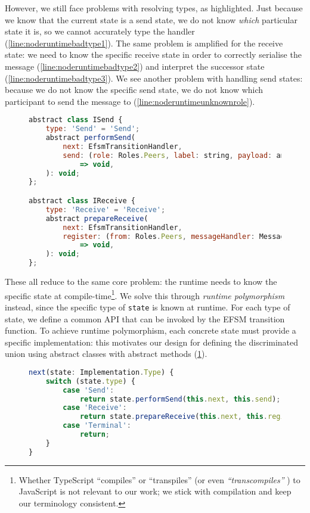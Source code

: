 However, we still face problems with resolving types, as highlighted.
Just because we know that the current state is a send state,
we do not know \textit{which} particular state it is,
so we cannot accurately type the handler (\cref{line:noderuntimebadtype1}).
The same problem is amplified for the receive state:
we need to know the specific receive state in order
to correctly serialise the message (\cref{line:noderuntimebadtype2})
and interpret the successor state (\cref{line:noderuntimebadtype3}).
We see another problem with handling send states:
because we do not know the specific send state, we do not know which
participant to send the message to (\cref{line:noderuntimeunknownrole}).

\begin{figure}[!h]
\begin{lstlisting}[language=javascript,tabsize=2]
abstract class ISend {
	type: 'Send' = 'Send';
	abstract performSend(
		next: EfsmTransitionHandler,
		send: (role: Roles.Peers, label: string, payload: any[]) 
			=> void,
	): void;
};

abstract class IReceive {
	type: 'Receive' = 'Receive';
	abstract prepareReceive(
		next: EfsmTransitionHandler,
		register: (from: Roles.Peers, messageHandler: MessageHandler)
			=> void,
	): void;
};
\end{lstlisting}
\label{lst:nodeabstractclass}
\end{figure}

These all reduce to the same core problem: the runtime
needs to know the specific state at compile-time\footnote{
Whether TypeScript ``compiles'' or ``transpiles''
(or even \textit{``transcompiles''} \cite{transcompiles}) to JavaScript
is not relevant to our work; we stick with compilation
and keep our terminology consistent.}.
We solve this through \textit{runtime polymorphism} instead, since
the specific type of \texttt{state} is known at runtime.
For each type of state, we define a common API that can be invoked
by the EFSM transition function. To achieve runtime polymorphism,
each concrete state must provide a specific implementation: 
this motivates our design for defining the discriminated union
using abstract classes with abstract methods 
(\cref{lst:nodeabstractclass}).

\begin{figure}[!h]
\begin{lstlisting}[language=javascript,tabsize=2]
next(state: Implementation.Type) {
	switch (state.type) {
		case 'Send':
			return state.performSend(this.next, this.send);
		case 'Receive':
			return state.prepareReceive(this.next, this.register);
		case 'Terminal':
			return;
	}
}
\end{lstlisting}
\label{lst:noderuntime}
\end{figure}

